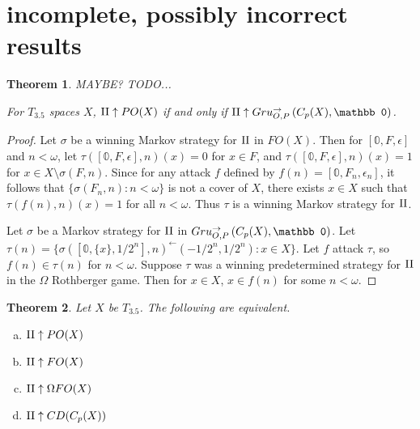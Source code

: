 \documentclass[11pt]{article}
\theoremstyle{plain}
\newtheorem{theorem}{Theorem}
\theoremstyle{definition}
\theoremstyle{remark}
\theoremstyle{plain}
\theoremstyle{definition}
\theoremstyle{remark}
\begin{document}
\section{incomplete, possibly incorrect results}
\begin{theorem}
MAYBE? TODO...

For \(T_{3.5}\) spaces \(X\),
\(\mathrm{II}\uparrow PO(X)\) if and only if
\(\plII\win\gruConGame{C_p(X)}{\mathbb 0}\).
\end{theorem}
\begin{proof}
Let \(\sigma\) be a winning Markov strategy for \(\mathrm{II}\)
in \(FO(X)\). Then for \([\mathbb 0,F,\epsilon]\)
and \(n<\omega\), let 
\(\tau([\mathbb 0,F,\epsilon],n)(x)=0\) for \(x\in F\), and
\(\tau([\mathbb 0,F,\epsilon],n)(x)=1\) for 
\(x\in X\setminus\sigma(F,n)\). Since for any
attack \(f\) defined by \(f(n)=[\mathbb 0,F_n,\epsilon_n]\),
it follows that \(\{\sigma(F_n,n):n<\omega\}\) is not
a cover of \(X\), there exists \(x\in X\) such that
\(\tau(f(n),n)(x)=1\) for all \(n<\omega\). Thus
\(\tau\) is a winning Markov strategy for \(\mathrm{II}\).

Let \(\sigma\) be a Markov strategy for \(\mathrm{II}\)
in \(\gruConGame{C_p(X)}{\mathbb 0}\).
Let \(\tau(n)=\{\sigma([\mathbb 0,\{x\},1/2^n],n)^{\leftarrow}(-1/2^n,1/2^n):x\in X\}\).
Let \(f\) attack \(\tau\), so \(f(n)\in\tau(n)\) for \(n<\omega\).
Suppose \(\tau\) was a winning predetermined strategy for \(\mathrm{II}\) in
the \(\Omega\) Rothberger game. Then for \(x\in X\),
\(x\in f(n)\) for some \(n<\omega\).
\end{proof}


\begin{theorem}
Let \(X\) be \(T_{3.5}\). The following are equivalent.
\begin{enumerate}[a)]
\item \(\mathrm{II} \uparrow PO(X)\)
\item \(\mathrm{II} \uparrow FO(X)\)
\item \(\mathrm{II} \uparrow \Omega FO(X)\)
\item \(\mathrm{II} \uparrow CD(C_p(X))\)
\end{enumerate}
\end{theorem}
\end{document}
